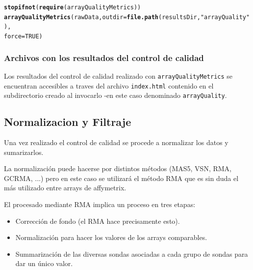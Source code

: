 \documentclass[a4paper]{article}\usepackage[]{graphicx}\usepackage[]{color}
\makeatletter
\newcommand{\hlnum}[1]{\textcolor[rgb]{0.686,0.059,0.569}{#1}}%
\newcommand{\hlstr}[1]{\textcolor[rgb]{0.192,0.494,0.8}{#1}}%
\newcommand{\hlstd}[1]{\textcolor[rgb]{0.345,0.345,0.345}{#1}}%
\newcommand{\hlkwc}[1]{\textcolor[rgb]{0.333,0.667,0.333}{#1}}%
\newcommand{\hlkwd}[1]{\textcolor[rgb]{0.737,0.353,0.396}{\textbf{#1}}}%
\newenvironment{kframe}{%
 \def\at@end@of@kframe{}%
 \ifinner\ifhmode%
  \def\at@end@of@kframe{\end{minipage}}%
  \begin{minipage}{\columnwidth}%
 \fi\fi%
 \def\FrameCommand##1{\hskip\@totalleftmargin \hskip-\fboxsep
 \colorbox{shadecolor}{##1}\hskip-\fboxsep
     \hskip-\linewidth \hskip-\@totalleftmargin \hskip\columnwidth}%
 \MakeFramed {\advance\hsize-\width
   \@totalleftmargin\z@ \linewidth\hsize
   \@setminipage}}%
 {\par\unskip\endMakeFramed%
 \at@end@of@kframe}
\newenvironment{knitrout}{}{} %
\makeatother
\begin{document}
\begin{knitrout}
\color{fgcolor}\begin{kframe}
\begin{alltt}
\hlkwd{stopifnot}\hlstd{(}\hlkwd{require}\hlstd{(arrayQualityMetrics))}
\hlkwd{arrayQualityMetrics}\hlstd{(rawData,} \hlkwc{outdir} \hlstd{=} \hlkwd{file.path}\hlstd{(resultsDir,} \hlstr{"arrayQuality"}\hlstd{),}
                    \hlkwc{force}\hlstd{=}\hlnum{TRUE}\hlstd{)}
\end{alltt}


{\ttfamily\noindent\itshape\color{messagecolor}{\#\# The report will be written into directory '/home/alex/Dropbox (VHIR)/Scripts/Exemple\_Analisis\_BioC/results/arrayQuality'.}}\end{kframe}
\end{knitrout}

\subsubsection{Archivos con los resultados del control de calidad}

Los resultados del control de calidad realizado con \texttt{arrayQualityMetrics} se encuentran  accesibles a traves del archivo \texttt{index.html} contenido en el subdirectorio creado al invocarlo -en este caso denominado \texttt{arrayQuality}.


\subsection{Normalizacion y Filtraje}

Una vez realizado el control de calidad se procede a normalizar los datos y sumarizarlos.

La normalización puede hacerse por distintos métodos (MAS5, VSN, RMA, GCRMA, ...) pero en este caso se utilizará el método RMA que es sin duda el más utilizado entre arrays de affymetrix.

El procesado mediante RMA implica un proceso en tres etapas: 
\begin{itemize}
\item Corrección de fondo (el RMA hace precisamente esto).
\item Normalización para hacer los valores de los arrays comparables.
\item Summarización de las diversas sondas asociadas a cada grupo de sondas para dar un único valor.
\end{itemize}
\end{document}
